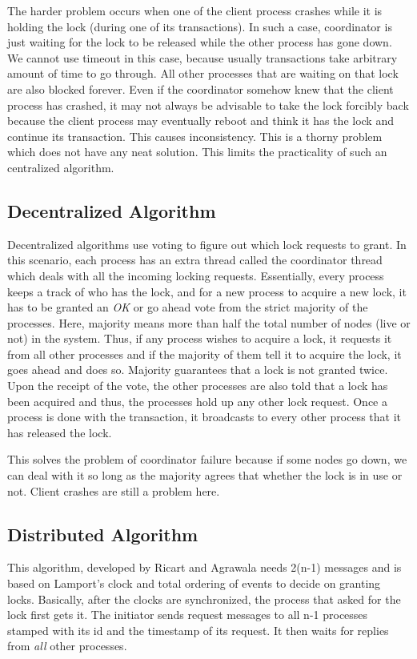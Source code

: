 \documentclass[twoside]{article}
\begin{document}
The harder problem occurs when one of the client process crashes while it is holding the lock (during one of its transactions). In such a case, coordinator is just waiting for the lock to be released while the other process has gone down. We cannot use timeout in this case, because usually transactions take arbitrary amount of time to go through. All other processes that are waiting on that lock are also blocked forever. Even if the coordinator somehow knew that the client process has crashed, it may not always be advisable to take the lock forcibly back because the client process may eventually reboot and think it has the lock and continue its transaction. This causes inconsistency. This is a thorny problem which does not have any neat solution. This limits the practicality of such an centralized algorithm.

\subsection{Decentralized Algorithm}
Decentralized algorithms use voting to figure out which lock requests to grant. In this scenario, each process has an extra thread called the coordinator thread which deals with all the incoming locking requests. Essentially, every process keeps a track of who has the lock, and for a new process to acquire a new lock, it has to be granted an \emph{OK} or go ahead vote from the strict majority of the processes. Here, majority means more than half the total number of nodes (live or not) in the system. Thus, if any process wishes to acquire a lock, it requests it from all other processes and if the majority of them tell it to acquire the lock, it goes ahead and does so. Majority guarantees that a lock is not granted twice. Upon the receipt of the vote, the other processes are also told that a lock has been acquired and thus, the processes hold up any other lock request. Once a process is done with the transaction, it broadcasts to every other process that it has released the lock.

This solves the problem of coordinator failure because if some nodes go down, we can deal with it so long as the majority agrees that whether the lock is in use or not. Client crashes are still a problem here.

\subsection{Distributed Algorithm}
This algorithm, developed by Ricart and Agrawala needs 2(n-1) messages and is based on Lamport's clock and total ordering of events to decide on granting locks. Basically, after the clocks are synchronized, the process that asked for the lock first gets it. The initiator sends request messages to all n-1 processes stamped with its id and the timestamp of its request. It then waits for replies from \emph{all} other processes.
\end{document}

